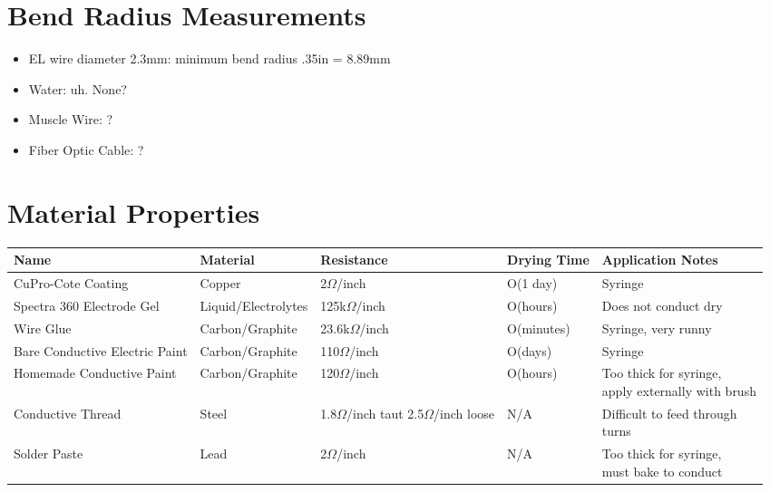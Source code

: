 \section{Bend Radius Measurements}
\begin{itemize}
\item EL wire diameter 2.3mm: minimum bend radius .35in = 8.89mm
\item Water: uh.  None?
\item Muscle Wire: ?
\item Fiber Optic Cable: ?
\end{itemize}

\section{Material Properties}

\begin{table*}[t]
\begin{tabular}{ l || l | p{3cm} | l | p{4cm} }
  \hline
  Name & Material & Resistance & Drying Time & Application Notes\\ \hline
  CuPro-Cote Coating & Copper & 2$\Omega$/inch & O(1 day) & Syringe \\ \hline
  Spectra 360 Electrode Gel & Liquid/Electrolytes & 125k$\Omega$/inch & O(hours) & Does not conduct dry \\ \hline
  Wire Glue & Carbon/Graphite &  23.6k$\Omega$/inch & O(minutes) & Syringe, very runny \\ \hline
  Bare Conductive Electric Paint & Carbon/Graphite & 110$\Omega$/inch & O(days) & Syringe \\ \hline
  Homemade Conductive Paint & Carbon/Graphite & 120$\Omega$/inch & O(hours) & \parbox{4cm}{Too thick for syringe,\\ apply externally with brush} \\ \hline
  Conductive Thread & Steel & \parbox{3cm}{1.8$\Omega$/inch taut \\ 2.5$\Omega$/inch loose} & N/A & \parbox{4cm}{Difficult to feed through\\turns} \\ \hline
  Solder Paste & Lead & 2$\Omega$/inch & N/A & \parbox{4cm}{Too thick for syringe,\\ must bake to conduct} \\ \hline
\end{tabular}
\end{table*}
